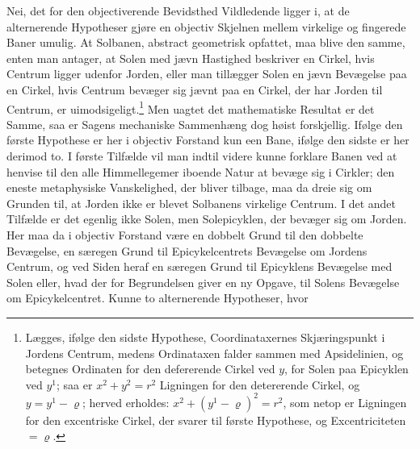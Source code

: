 \documentclass[12pt,a4paper]{book}
\begin{document}
Nei, det for den objectiverende Bevidsthed Vildledende ligger i, at de
alternerende Hypotheser gjøre en objectiv Skjelnen mellem virkelige og
fingerede Baner umulig. At Solbanen, abstract geometrisk opfattet, maa
blive den samme, enten man antager, at Solen med jævn Hastighed
beskriver en Cirkel, hvis Centrum ligger udenfor Jorden, eller man
tillægger Solen en jævn Bevægelse paa en Cirkel, hvis Centrum bevæger
sig jævnt paa en Cirkel, der har Jorden til Centrum, er
uimodsigeligt.\footnote{%
Lægges, ifølge den sidste Hypothese, Coordinataxernes Skjæringspunkt i
Jordens Centrum, medens Ordinataxen falder sammen med Apsidelinien, og
betegnes Ordinaten for den defererende Cirkel ved $y$, for Solen paa
Epicyklen ved $y^{1}$; saa er $x^{2} + y^{2} = r^{2}$ Ligningen for den
detererende Cirkel, og $y = y^{1} - \varrho$; herved erholdes:
$x^{2} + (y^{1} - \varrho)^{2} = r^{2}$, som netop er Ligningen for den
excentriske Cirkel, der svarer til første Hypothese, og Excentriciteten
$= \varrho$.} Men uagtet det mathematiske Resultat er det Samme, saa er
Sagens mechaniske Sammenhæng dog høist forskjellig. Ifølge den første
Hypothese er her i objectiv Forstand kun een Bane, ifølge den sidste er
her derimod to. I første Tilfælde vil man indtil videre kunne forklare
Banen ved at henvise til den alle Himmellegemer iboende Natur at bevæge
sig i Cirkler; den eneste metaphysiske Vanskelighed, der bliver tilbage,
maa da dreie sig om Grunden til, at Jorden ikke er blevet Solbanens
virkelige Centrum. I det andet Tilfælde er det egenlig ikke Solen, men
Solepicyklen, der bevæger sig om Jorden. Her maa da i objectiv Forstand
være en dobbelt Grund til den dobbelte Bevægelse, en særegen Grund til
Epicykelcentrets Bevægelse om Jordens Centrum, og ved Siden heraf en
særegen Grund til Epicyklens Bevægelse med Solen eller, hvad der for
Begrundelsen giver en ny Opgave, til Solens Bevægelse om
Epicykelcentret. Kunne to alternerende Hypotheser, hvor
\end{document}
